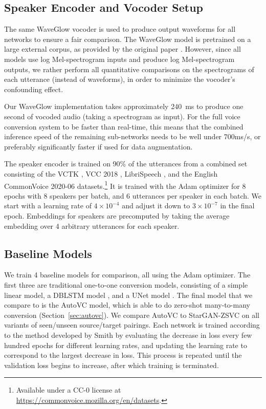 \subsection{Speaker Encoder and Vocoder Setup}
The same WaveGlow vocoder is used
to produce output waveforms
for all networks
to ensure a fair comparison. 
The WaveGlow model is pretrained on a large external corpus, as provided by the original paper \cite{waveglow}. 
However, since all models use log Mel-spectrogram inputs and produce log Mel-spectrogram outputs, we rather perform all quantitative comparisons on the spectrograms of each utterance (instead of waveforms), in order to minimize the vocoder's confounding effect. 

Our WaveGlow implementation takes approximately 240~ms to produce one second of vocoded audio (taking a spectrogram as input).
For the full voice conversion system to be faster than real-time, this means that the combined inference speed of the remaining sub-networks needs to be well under 700ms/s, or preferably significantly faster if used for data augmentation.

The speaker encoder is trained on 90\% of the utterances from a combined set consisting of the VCTK \cite{vctk}, VCC 2018 \cite{vcc2018}, LibriSpeech \cite{librispeech}, and the English CommonVoice 2020-06 datasets.\footnote{Available under a CC-0 license at \url{https://commonvoice.mozilla.org/en/datasets}.} 
It is trained with the Adam optimizer \cite{adam} for 8 epochs with 8 speakers per batch, and 6 utterances per speaker in each batch.
We start with a learning rate of $4\times10^{-4}$ and adjust it down to $3\times10^{-7}$ in the final epoch.
Embeddings for speakers are precomputed by taking the average embedding over 4 arbitrary utterances for each speaker.

\subsection{Baseline Models}
We train 4 baseline models for comparison, all using the Adam optimizer.
The first three are traditional one-to-one conversion models, consisting of a simple linear model, a DBLSTM model \cite{BDLSTM}, and a UNet model \cite{unet}. 
The final model that we compare to is the AutoVC model, 
which is able to do zero-shot many-to-many conversion (Section~\ref{sec:autovc}). 
We compare AutoVC to StarGAN-ZSVC on all variants of seen/unseen source/target pairings. 
Each network is trained according to the method developed by
Smith \cite{smith:cyclic} by evaluating the decrease in loss every few hundred epochs for different learning rates, and updating the learning rate to correspond to the largest decrease in loss. 
This process is repeated until the validation loss begins to increase, after which training is terminated.


